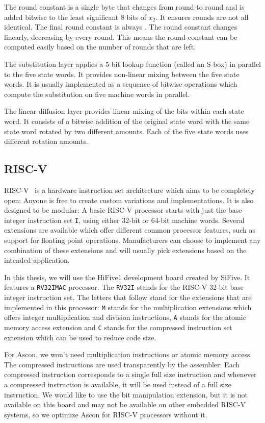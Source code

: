 The round constant is a single byte that changes from round to round and is
added bitwise to the least significant 8 bits of $x_2$. It ensures rounds are
not all identical. The final round constant is always . The round
constant changes linearly, decreasing by  every round. This means
the round constant can be computed easily based on the number of rounds that are
left.

The substitution layer applies a 5-bit lookup function (called an S-box) in
parallel to the five state words. It provides non-linear mixing between the five
state words. It is usually implemented as a sequence of bitwise operations which
compute the substitution on five machine words in parallel.

The linear diffusion layer provides linear mixing of the bits within each state
word. It consists of a bitwise addition of the original state word with the same
state word rotated by two different amounts. Each of the five state words uses
different rotation amounts.


\subsection{RISC-V}
RISC-V~\cite{riscv} is a hardware instruction set architecture which aims to be
completely open: Anyone is free to create custom variations and implementations.
It is also designed to be modular: A basic RISC-V processor starts with just the
base integer instruction set \texttt{I}, using either 32-bit or 64-bit machine
words. Several extensions are available which offer different common processor
features, such as support for floating point operations. Manufacturers can
choose to implement any combination of these extensions and will usually pick
extensions based on the intended application.

In this thesis, we will use the HiFive1 development board created by SiFive. It
features a \texttt{RV32IMAC} processor. The \texttt{RV32I} stands for the RISC-V
32-bit base integer instruction set. The letters that follow stand for the
extensions that are implemented in this processor: \texttt{M} stands for the
multiplication extensions which offers integer multiplication and division
instructions, \texttt{A} stands for the atomic memory access extension and
\texttt{C} stands for the compressed instruction set extension which can be used
to reduce code size.

For Ascon, we won't need multiplication instructions or atomic memory access.
The compressed instructions are used transparently by the assembler: Each
compressed instruction corresponds to a single full size instruction and
whenever a compressed instruction is available, it will be used instead of a
full size instruction. We would like to use the bit manipulation extension, but
it is not available on this board and may not be available on other embedded
RISC-V systems, so we optimize Ascon for RISC-V processors without it.

